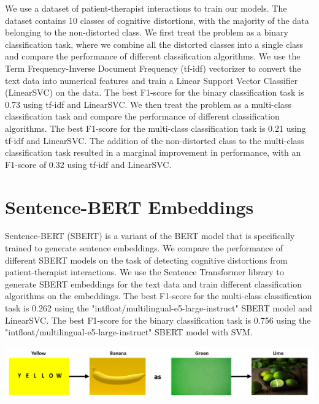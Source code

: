 \documentclass[a0,landscape]{a0poster}
\begin{document}
\begin{multicols}{4}
We use a dataset of patient-therapist interactions to train our models. The dataset contains 10 classes of cognitive distortions, with the majority of the data belonging 
to the non-distorted class. We first treat the problem as a binary classification task, where we combine all the distorted classes into a single class and compare the 
performance of different classification algorithms. We use the Term Frequency-Inverse Document Frequency (tf-idf) vectorizer to convert the text data into numerical 
features and train a Linear Support Vector Classifier (LinearSVC) on the data. The best F1-score for the binary classification task is 0.73 using tf-idf and LinearSVC. 
We then treat the problem as a multi-class classification task and compare the performance of different classification algorithms. The best F1-score for the multi-class 
classification task is 0.21 using tf-idf and LinearSVC. The addition of the non-distorted class to the multi-class classification task resulted in a marginal improvement 
in performance, with an F1-score of 0.32 using tf-idf and LinearSVC.

\color{Teal}
\section*{Sentence-BERT Embeddings}
\color{Black}

Sentence-BERT (SBERT) is a variant of the BERT model that is specifically trained to generate sentence embeddings. We compare the performance of different SBERT models 
on the task of detecting cognitive distortions from patient-therapist interactions. We use the Sentence Transformer library to generate SBERT embeddings for the text 
data and train different classification algorithms on the embeddings. The best F1-score for the multi-class classification task is 0.262 using the 
"intfloat/multilingual-e5-large-instruct" SBERT model and LinearSVC. The best F1-score for the binary classification task is 0.756 using the 
"intfloat/multilingual-e5-large-instruct" SBERT model with SVM.

\begin{center}\vspace{1cm}
\includegraphics[width=0.99\linewidth]{Example1.png}
\end{center}\vspace{1cm}


\end{multicols}
\end{document}
